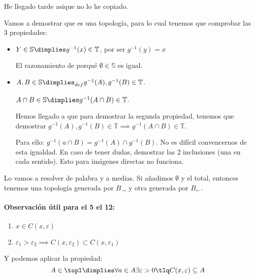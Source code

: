 \begin{problem}[11]
He llegado tarde
\solution
asique no lo he copiado.
\end{problem}

\begin{problem}[6]
\ppart
\ppart
\solution
\spart
Vamos a demostrar que es una topología, para lo cual tenemos que comprobar las 3 propiedades:

\begin{itemize}
\item $Y\in \mathbb{S} \dimplies g^{-1}(x)\in \mathbb{T}$, por ser $g^{-1}(y)=x$

El razonamiento de porqué $\emptyset \in \mathbb{S}$ es igual.

\item $A,B \in \mathbb{S} \dimplies_{def} g^{-1}(A),g^{-1}(B) \in \mathbb{T}$.

$A\cap B \in\mathbb{S} \dimplies g^{-1}(A\cap B) \in \mathbb{T}$.

Hemos llegado a que para demostrar la segunda propiedad, tenemos que demostrar $g^{-1}(A),g^{-1}(B) \in \mathbb{T} \implies g^{-1}(A\cap B) \in \mathbb{T}$.

Para ello: $g^{-1}(a\cap B) = g^{-1}(A)\cap g^{-1}(B)$. No es difícil convencernos de esta igualdad. En caso de tener dudas, demostrar las 2 inclusiones (una en cada sentido). Esto para imágenes directas no funciona.
\end{itemize}
\end{problem}


\begin{problem}[9]
Lo vamos a resolver de palabra y a medias.
\ppart
\ppart
\ppart
\solution
\spart Si añadimos $\emptyset$ y el total, entonces tenemos una topología generada por $B_{\rightarrow}$ y otra generada por $B_{\leftarrow}$.
\spart  
\spart
\end{problem}

\paragraph{Observación útil para el 5  el 12:}  
\begin{enumerate}
\item $x \in C(x,\varepsilon)$
\item $\varepsilon_1 > \varepsilon_2 \implies C(x,\varepsilon_2) \subset C(x,\varepsilon_1)$
\end{enumerate}

Y podemos aplicar la propiedad:
\[
A\in\topl \dimplies \forall a\in A \exists \varepsilon > 0 \tlq C(x,\varepsilon)\subseteq A
\]

